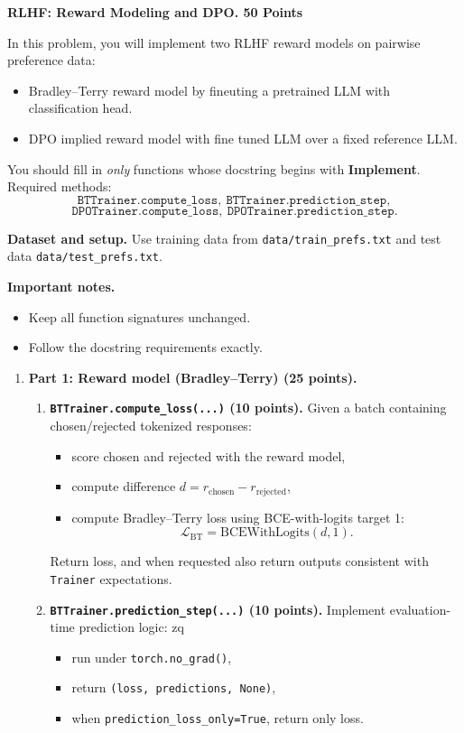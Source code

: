 \begin{Q}
\textbf{RLHF: Reward Modeling and DPO. 50 Points}

In this problem, you will implement two RLHF reward models on pairwise preference data:
\begin{itemize}
\item Bradley--Terry reward model by fineuting a pretrained LLM with
  classification head. 
\item DPO implied reward model with fine tuned LLM over a fixed reference LLM.
\end{itemize}

You should fill in \emph{only} functions whose docstring begins with \textbf{Implement}.  
Required methods:
\[
\texttt{BTTrainer.compute\_loss},\ \texttt{BTTrainer.prediction\_step},
\]
\[
\texttt{DPOTrainer.compute\_loss},\ \texttt{DPOTrainer.prediction\_step}.
\]

\medskip
\noindent\textbf{Dataset and setup.}
Use training data from \texttt{data/train\_prefs.txt} and test data \texttt{data/test\_prefs.txt}.
 
\medskip
\noindent\textbf{Important notes.}
\begin{itemize}
\item Keep all function signatures unchanged.
\item Follow the docstring requirements exactly.
\end{itemize}

\begin{enumerate}

\item \textbf{Part 1: Reward model (Bradley--Terry) (25 points).}

\begin{enumerate}
\item \textbf{\texttt{BTTrainer.compute\_loss(...)} (10 points).}
Given a batch containing chosen/rejected tokenized responses:
\begin{itemize}
\item score chosen and rejected with the reward model,
\item compute difference $d = r_{\text{chosen}} - r_{\text{rejected}}$,
\item compute Bradley--Terry loss using BCE-with-logits target 1:
\[
\mathcal{L}_{\mathrm{BT}} = \mathrm{BCEWithLogits}(d, 1).
\]
\end{itemize}
Return loss, and when requested also return outputs consistent with \texttt{Trainer} expectations.

\item \textbf{\texttt{BTTrainer.prediction\_step(...)} (10 points).}
Implement evaluation-time prediction logic:
zq\begin{itemize}
\item run under \texttt{torch.no\_grad()},
\item return \texttt{(loss, predictions, None)},
\item when \texttt{prediction\_loss\_only=True}, return only loss.
\end{itemize}


\end{enumerate}
\end{enumerate}
\end{Q}
